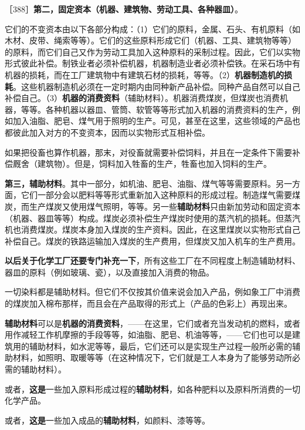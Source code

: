 ［388］\textbf{第二，固定资本（机器、建筑物、劳动工具、各种器皿）}。

它们的不变资本由以下各部分构成：（1）它们的原料，金属、石头、有机原料（如木材、皮带、绳索等等）。它们的这些原料形成它们（机器、工具、建筑物等等）的原料，而它们自己又作为劳动工具加入这种原料的采制过程。因此，它们以实物形式彼此补偿。制铁业者必须补偿机器，机器制造业者必须补偿铁。在采石场中有机器的损耗，而在工厂建筑物中有建筑石材的损耗，等等。（2）\textbf{机器制造机的损耗}。这些机器制造机必须在一定时期内由同种新产品补偿。同种产品自然可以自己补偿自己。（3）\textbf{机器的消费资料}（辅助材料）。机器消费煤炭，但煤炭也消费机器，等等。各种机器以器皿、管筒、软管等等形式加入机器的消费资料的生产，例如加入油脂、肥皂、煤气\fontbox{~\{}用于照明\fontbox{\}~}的生产。可见，甚至在这里，这些领域的产品也都彼此加入对方的不变资本，因而以实物形式互相补偿。

如果把役畜也算作机器，那末，对役畜就需要补偿饲料，并且在一定条件下需要补偿厩舍（建筑物）。但是，饲料加入牲畜的生产，牲畜也加入饲料的生产。

\textbf{第三，辅助材料}。其中一部分，如机油、肥皂、油脂、煤气等等需要原料。另一方面，它们一部分会以肥料等等形式重新加入这种原料的形成过程。制造煤气需要煤炭，而生产煤炭又使用煤气照明，等等。另一些\textbf{辅助材料}只由新加劳动和固定资本（机器、器皿等等）构成。煤炭必须补偿生产煤炭时使用的蒸汽机的损耗。但蒸汽机也消费煤炭。煤炭本身加入煤炭的生产资料。因此，在这里煤炭以实物形式自己补偿自己。煤炭的铁路运输加入煤炭的生产费用，但煤炭又加入机车的生产费用。

\textbf{以后关于化学工厂还要专门补充一下}，所有这些工厂在不同程度上制造辅助材料、器皿的原料（例如玻璃、瓷），以及直接加入消费的物品。

一切染料都是辅助材料。但它们不仅按其价值来说会加入产品，例如象工厂中消费的煤炭加入棉布那样，而且会在产品取得的形式上（产品的色彩上）再现出来。

\textbf{辅助材料}可以是\textbf{机器的消费资料}，——在这里，它们或者充当发动机的燃料，或者用作减轻工作机摩擦的手段等等，如油脂、肥皂、机油等等，——它们也可以是建筑用的辅助材料，如水泥等等，最后，它们还可以是实现生产过程一般所必需的辅助材料，如照明、取暖等等（在这种情况下，它们就是工人本身为了能够劳动所必需的辅助材料）。

或者，\textbf{这是}一些加入原料形成过程的\textbf{辅助材料}，如各种肥料以及原料所消费的一切化学产品。

或者，\textbf{这是}一些加入成品的\textbf{辅助材料}，如颜料、漆等等。


